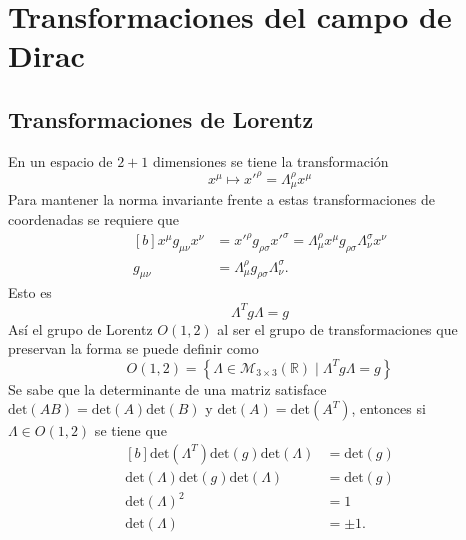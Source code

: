 \section{Transformaciones del campo de Dirac}
\subsection{Transformaciones de Lorentz}
En un espacio de $2+1$ dimensiones se tiene la transformación
\begin{equation}
	x^{\mu} \longmapsto x'^{\rho}=\Lambda^{\rho}_\mu x^{\mu}
\end{equation}
Para mantener la norma invariante frente a estas transformaciones de coordenadas se requiere que
\begin{equation}
	\begin{aligned}[b]
		x^{\mu}g_{\mu\nu}x^{\nu} & = x'^{\rho}g_{\rho\sigma}x'^{\sigma} = \Lambda^{\rho}_\mu x^{\mu}g_{\rho\sigma}\Lambda^{\sigma}_\nu x^{\nu} \\
		g_{\mu\nu}               & = \Lambda_\mu^{\rho}g_{\rho\sigma}\Lambda_\nu^{\sigma}.
	\end{aligned}\label{eq:lorentztrans1}
\end{equation}
Esto es
\begin{equation}
	\Lambda^{T}g\Lambda = g
\end{equation}
Así el grupo de Lorentz $O(1,2)$ al ser el grupo de transformaciones que preservan la forma se puede definir como
\begin{equation}
	O(1,2) = \left\{\Lambda \in \mathcal{M}_{3\times3}(\mathbb{R})\mid \Lambda^{T}g\Lambda = g\right\}
\end{equation}
Se sabe que la determinante de una matriz satisface $\text{det}(AB) = \text{det}(A)\text{det}(B)$ y $\text{det}(A) = \text{det}(A^T)$, entonces si $\Lambda \in O(1,2)$ se tiene que
\begin{equation}
	\begin{aligned}[b]
		\text{det}(\Lambda^T) \text{det}(g) \text{det}(\Lambda) & = \text{det}(g) \\
		\text{det}(\Lambda) \text{det}(g) \text{det}(\Lambda)   & = \text{det}(g) \\
		\text{det}(\Lambda)^2                                   & = 1             \\
		\text{det}(\Lambda)                                     & = \pm 1.
	\end{aligned}
\end{equation}
